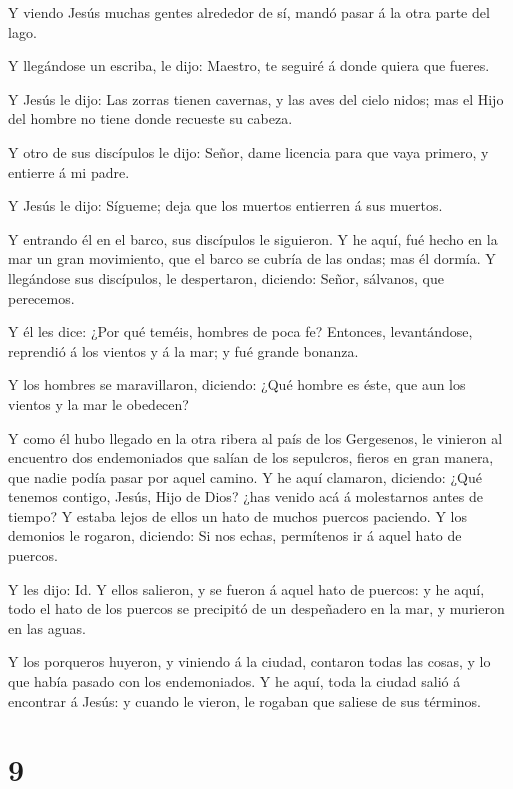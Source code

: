  Y viendo Jesús muchas gentes alrededor de sí, mandó pasar
á la otra parte del lago.

 Y llegándose un escriba, le dijo: Maestro, te seguiré á
donde quiera que fueres.

 Y Jesús le dijo: Las zorras tienen cavernas, y las aves
del cielo nidos; mas el Hijo del hombre no tiene donde recueste su
cabeza.

 Y otro de sus discípulos le dijo: Señor, dame licencia
para que vaya primero, y entierre á mi padre.

 Y Jesús le dijo: Sígueme; deja que los muertos entierren á
sus muertos.

 Y entrando él en el barco, sus discípulos le siguieron.
 Y he aquí, fué hecho en la mar un gran movimiento, que el
barco se cubría de las ondas; mas él dormía.  Y llegándose
sus discípulos, le despertaron, diciendo: Señor, sálvanos, que
perecemos.

 Y él les dice: ¿Por qué teméis, hombres de poca fe?
Entonces, levantándose, reprendió á los vientos y á la mar; y fué grande
bonanza.

 Y los hombres se maravillaron, diciendo: ¿Qué hombre es
éste, que aun los vientos y la mar le obedecen?

 Y como él hubo llegado en la otra ribera al país de los
Gergesenos, le vinieron al encuentro dos endemoniados que salían de los
sepulcros, fieros en gran manera, que nadie podía pasar por aquel
camino.  Y he aquí clamaron, diciendo: ¿Qué tenemos
contigo, Jesús, Hijo de Dios? ¿has venido acá á molestarnos antes de
tiempo?  Y estaba lejos de ellos un hato de muchos puercos
paciendo.  Y los demonios le rogaron, diciendo: Si nos
echas, permítenos ir á aquel hato de puercos.

 Y les dijo: Id. Y ellos salieron, y se fueron á aquel hato
de puercos: y he aquí, todo el hato de los puercos se precipitó de un
despeñadero en la mar, y murieron en las aguas.

 Y los porqueros huyeron, y viniendo á la ciudad, contaron
todas las cosas, y lo que había pasado con los endemoniados.
 Y he aquí, toda la ciudad salió á encontrar á Jesús: y
cuando le vieron, le rogaban que saliese de sus términos.

\hypertarget{section-8}{%
\section{9}\label{section-8}}

